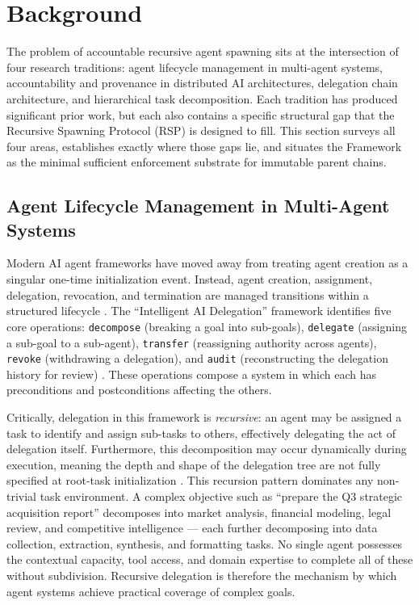 \section{Background}\label{sec:rs-background}

The problem of accountable recursive agent spawning sits at the intersection of four research traditions: agent lifecycle management in multi-agent systems, accountability and provenance in distributed AI architectures, delegation chain architecture, and hierarchical task decomposition. Each tradition has produced significant prior work, but each also contains a specific structural gap that the Recursive Spawning Protocol (RSP) is designed to fill. This section surveys all four areas, establishes exactly where those gaps lie, and situates the \bxthree{} Framework as the minimal sufficient enforcement substrate for immutable parent chains.

\subsection{Agent Lifecycle Management in Multi-Agent Systems}\label{sec:lifecycle}

Modern AI agent frameworks have moved away from treating agent creation as a singular one-time initialization event. Instead, agent creation, assignment, delegation, revocation, and termination are managed transitions within a structured lifecycle \cite{intelligent_ai_delegation}. The ``Intelligent AI Delegation'' framework identifies five core operations: \texttt{decompose} (breaking a goal into sub-goals), \texttt{delegate} (assigning a sub-goal to a sub-agent), \texttt{transfer} (reassigning authority across agents), \texttt{revoke} (withdrawing a delegation), and \texttt{audit} (reconstructing the delegation history for review) \cite[intelligent_ai_delegation, \S4.2]{arxiv2602.11865}. These operations compose a system in which each has preconditions and postconditions affecting the others.

Critically, delegation in this framework is \emph{recursive}: an agent may be assigned a task to identify and assign sub-tasks to others, effectively delegating the act of delegation itself. Furthermore, this decomposition may occur dynamically during execution, meaning the depth and shape of the delegation tree are not fully specified at root-task initialization \cite[intelligent_ai_delegation, \S4.1]{arxiv2602.11865}. This recursion pattern dominates any non-trivial task environment. A complex objective such as ``prepare the Q3 strategic acquisition report'' decomposes into market analysis, financial modeling, legal review, and competitive intelligence — each further decomposing into data collection, extraction, synthesis, and formatting tasks. No single agent possesses the contextual capacity, tool access, and domain expertise to complete all of these without subdivision. Recursive delegation is therefore the mechanism by which agent systems achieve practical coverage of complex goals.

